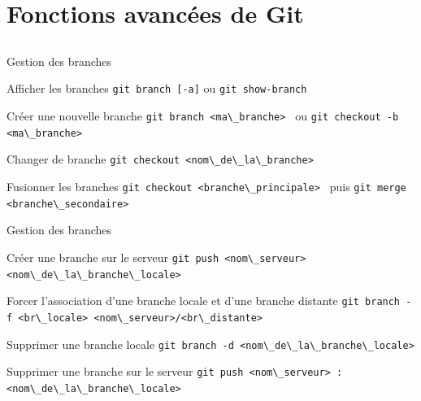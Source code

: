 \documentclass{beamer}
\begin{document}
\section{Fonctions avancées de Git}
\subsection{}

\begin{frame}[fragile]{Gestion des branches}
  \begin{block}{Afficher les branches}
    \textcolor{commandcolor}{\verb?git branch [-a]?}\linebreak
    ou \textcolor{commandcolor}{\verb?git show-branch?}
  \end{block}
  \begin{block}{Créer une nouvelle branche}
    \textcolor{commandcolor}{\verb?git branch <ma\_branche> ?}\linebreak
    ou \textcolor{commandcolor}{\verb?git checkout -b <ma\_branche> ?}
  \end{block}
  \begin{block}{Changer de branche}
    \textcolor{commandcolor}{\verb?git checkout <nom\_de\_la\_branche> ?}
  \end{block}
  \begin{block}{Fusionner les branches}
    \textcolor{commandcolor}{\verb?git checkout <branche\_principale> ?}\linebreak
    puis \textcolor{commandcolor}{\verb?git merge <branche\_secondaire> ?}
  \end{block}
\end{frame}

\begin{frame}[fragile]{Gestion des branches}
  \begin{block}{Créer une branche sur le serveur}
    \textcolor{commandcolor}{\verb?git push <nom\_serveur> <nom\_de\_la\_branche\_locale>?}
  \end{block}
  \begin{block}{Forcer l'association d'une branche locale et d'une branche distante}
    \textcolor{commandcolor}{\verb?git branch -f <br\_locale> <nom\_serveur>/<br\_distante>?}
  \end{block}
  \begin{block}{Supprimer une branche locale}
    \textcolor{commandcolor}{\verb?git branch -d <nom\_de\_la\_branche\_locale>?}
  \end{block}
  \begin{block}{Supprimer une branche sur le serveur}
    \textcolor{commandcolor}{\verb?git push <nom\_serveur> :<nom\_de\_la\_branche\_locale>?}
  \end{block}
\end{frame}
\end{document}
